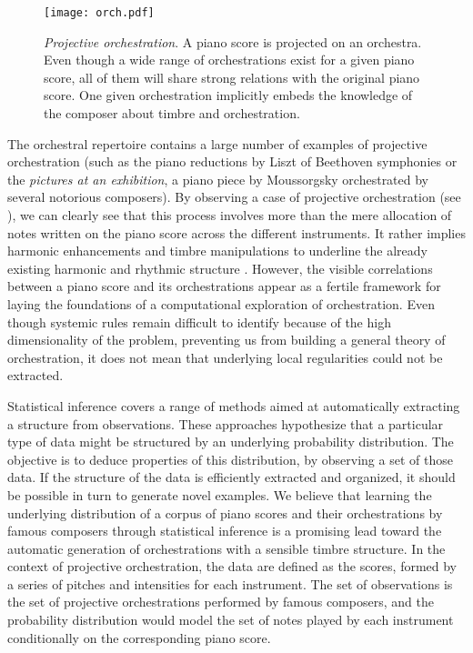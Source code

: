 \documentclass{amsart}
\begin{document}
	\begin{figure}
		\centering
		\texttt{[image: orch.pdf]}
		\caption{\textit{Projective orchestration}. A piano score is projected on an orchestra. Even though a wide range of orchestrations exist for a given piano score, all of them will share strong relations with the original piano score. One given orchestration implicitly embeds the knowledge of the composer about timbre and orchestration.}
		\label{fig:orch}
	\end{figure}
	
	The orchestral repertoire contains a large number of examples of projective orchestration (such as the piano reductions by Liszt of Beethoven symphonies or the \textit{pictures at an exhibition}, a piano piece by Moussorgsky orchestrated by several notorious composers). By observing a case of projective orchestration (see ), we can clearly see that this process involves more than the mere allocation of notes written on the piano score across the different instruments. It rather implies harmonic enhancements and timbre manipulations to underline the already existing harmonic and rhythmic structure \cite{mcadams2013timbre}. However, the visible correlations between a piano score and its orchestrations appear as a fertile framework for laying the foundations of a computational exploration of orchestration. Even though systemic rules remain difficult to identify because of the high dimensionality of the problem, preventing us from building a general theory of orchestration, it does not mean that underlying local regularities could not be extracted.
	
	Statistical inference covers a range of methods aimed at automatically extracting a structure from observations. These approaches hypothesize that a particular type of data might be structured by an underlying probability distribution. The objective is to deduce properties of this distribution, by observing a set of those data. 
	If the structure of the data is efficiently extracted and organized, it should be possible in turn to generate novel examples.
	We believe that learning the underlying distribution of a corpus of piano scores and their orchestrations by famous composers through statistical inference is a promising lead toward the automatic generation of orchestrations with a sensible timbre structure.
	In the context of projective orchestration, the data are defined as the scores, formed by a series of pitches and intensities for each instrument. The set of observations is the set of projective orchestrations performed by famous composers, and the probability distribution would model the set of notes played by each instrument conditionally on the corresponding piano score.
	
\end{document}
